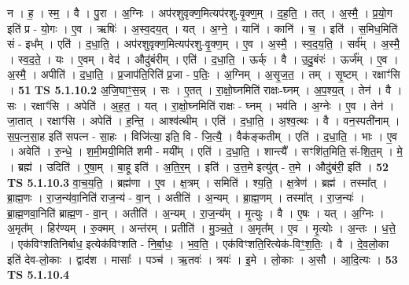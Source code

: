 \documentclass[17pt]{extarticle}
\begin{document}
                  न । ह॒ । स्म॒ । वै । पु॒रा । अ॒ग्निः । अप॑रशुवृक्ण॒मित्यप॑रशु-वृ॒क्ण॒म् । द॒ह॒ति॒ । तत् । अ॒स्मै॒ । प्र॒यो॒ग इति॑ प्र - यो॒गः । ए॒व । ऋषिः॑ । अ॒स्व॒दय॒त् । यत् । अ॒ग्ने॒ । यानि॑ । कानि॑ । च॒ । इति॑ । स॒मिध॒मिति॑ सं - इध᳚म् । एति॑ । द॒धा॒ति॒ । अप॑रशुवृक्ण॒मित्यप॑रशु-वृ॒क्ण॒म् । ए॒व । अ॒स्मै॒ । स्व॒द॒य॒ति॒ । सर्व᳚म् । अ॒स्मै॒ । स्व॒द॒ते॒ । यः । ए॒वम् । वेद॑ । औदु॑बंरीम् । एति॑ । द॒धा॒ति॒ । ऊर्क् । वै । उ॒दु॒बंरः॑ । ऊर्ज᳚म् । ए॒व । अ॒स्मै॒ । अपीति॑ । द॒धा॒ति॒ । प्र॒जाप॑ति॒रिति॑ प्र॒जा - प॒तिः॒ । अ॒ग्निम् । अ॒सृ॒ज॒त॒ । तम् । सृ॒ष्टम् । रक्षाꣳ॑सि । \textbf{  51} \newline
                  \newline
                                \textbf{ TS 5.1.10.2} \newline
                  अ॒जि॒घाꣳ॒॒स॒न्न् । सः । ए॒तत् । रा॒क्षो॒घ्नमिति॑ राक्षः-घ्नम् । अ॒प॒श्य॒त् । तेन॑ । वै । सः । रक्षाꣳ॑सि । अपेति॑ । अ॒ह॒त॒ । यत् । रा॒क्षो॒घ्नमिति॑ राक्षः - घ्नम् । भव॑ति । अ॒ग्नेः । ए॒व । तेन॑ । जा॒तात् । रक्षाꣳ॑सि । अपेति॑ । ह॒न्ति॒ । आश्व॑त्थीम् । एति॑ । द॒धा॒ति॒ । अ॒श्व॒त्थः । वै । वन॒स्पती॑नाम् । स॒प॒त्न॒सा॒ह इति॑ सपत्न - सा॒हः । विजि॑त्या॒ इति॒ वि - जि॒त्यै॒ । वैक॑ङ्कतीम् । एति॑ । द॒धा॒ति॒ । भाः । ए॒व । अवेति॑ । रु॒न्धे॒ । श॒मी॒मयी॒मिति॑ शमी - मयी᳚म् । एति॑ । द॒धा॒ति॒ । शान्त्यै᳚ । सꣳशि॑त॒मिति॒ सं-शि॒त॒म् । मे॒ । ब्रह्म॑ । उदिति॑ । ए॒षा॒म् । बा॒हू इति॑ । अ॒ति॒र॒म् । इति॑ । उ॒त्त॒मे इत्यु॑त् - त॒मे । औदु॑बंरी॒ इति॑ । \textbf{  52} \newline
                  \newline
                                \textbf{ TS 5.1.10.3} \newline
                  वा॒च॒य॒ति॒ । ब्रह्म॑णा । ए॒व । क्ष॒त्रम् । समिति॑ । श्य॒ति॒ । क्ष॒त्रेण॑ । ब्रह्म॑ । तस्मा᳚त् । ब्रा॒ह्म॒णः । रा॒ज॒न्य॑वा॒निति॑ राज॒न्य॑ - वा॒न् । अतीति॑ । अ॒न्यम् । ब्रा॒ह्म॒णम् । तस्मा᳚त् । रा॒ज॒न्यः॑ । ब्रा॒ह्म॒णवा॒निति॑ ब्राह्म॒ण - वा॒न् । अतीति॑ । अ॒न्यम् । रा॒ज॒न्य᳚म् । मृ॒त्युः । वै । ए॒षः । यत् । अ॒ग्निः । अ॒मृत᳚म् । हिर॑ण्यम् । रु॒क्मम् । अन्त॑रम् । प्रतीति॑ । मु॒ञ्च॒ते॒ । अ॒मृत᳚म् । ए॒व । मृ॒त्योः । अ॒न्तः । ध॒त्ते॒ । एक॑विꣳशतिनिर्बाध॒ इत्येक॑विꣳशति - नि॒र्बा॒धः॒ । भ॒व॒ति॒ । एक॑विꣳशति॒रित्येक॑-विꣳ॒॒श॒तिः॒ । वै । दे॒व॒लो॒का इति॑ देव-लो॒काः । द्वाद॑श । मासाः᳚ । पञ्च॑ । ऋ॒तवः॑ । त्रयः॑ । इ॒मे । लो॒काः । अ॒सौ । आ॒दि॒त्यः । \textbf{  53} \newline
                  \newline
                                \textbf{ TS 5.1.10.4} \newline
\end{document}
